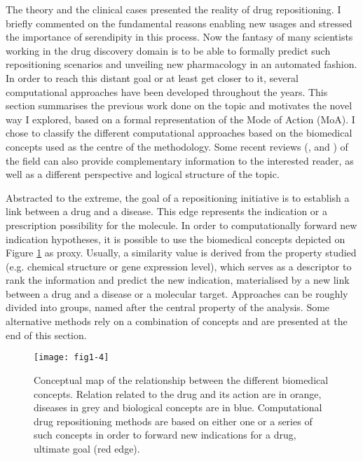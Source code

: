 The theory and the clinical cases presented the reality of drug repositioning. I briefly commented on the fundamental reasons enabling new usages and stressed the importance of serendipity in this process. Now the fantasy of many scientists working in the drug discovery domain is to be able to formally predict such repositioning scenarios and unveiling new pharmacology in an automated fashion. In order to reach this distant goal or at least get closer to it, several computational approaches have been developed throughout the years. This section summarises the previous work done on the topic and motivates the novel way I explored, based on a formal representation of the Mode of Action (MoA). I chose to classify the different computational approaches based on the biomedical concepts used as the centre of the methodology. Some recent reviews (\cite{ashburn2004drug}, \cite{dudley2011exploiting} and \cite{hurle2013computational}) of the field can also provide complementary information to the interested reader, as well as a different perspective and logical structure of the topic.

Abstracted to the extreme, the goal of a repositioning initiative is to establish a link between a drug and a disease. This edge represents the indication or a prescription possibility for the molecule. In order to computationally forward new indication hypotheses, it is possible to use the biomedical concepts depicted on Figure \ref{fig1-4} as proxy. Usually, a similarity value is derived from the property studied (e.g. chemical structure or gene expression level), which serves as a descriptor to rank the information and predict the new indication, materialised by a new link between a drug and a disease or a molecular target. Approaches can be roughly divided into groups, named after the central property of the analysis. Some alternative methods rely on a combination of concepts and are presented at the end of this section.

\begin{figure}[ht]
    \centering
    \texttt{[image: fig1-4]}
    \caption{Conceptual map of the relationship between the different biomedical concepts. Relation related to the drug and its action are in orange, diseases in grey and biological concepts are in blue. Computational drug repositioning methods are based on either one or a series of such concepts in order to forward new indications for a drug, ultimate goal (red edge).}
    \label{fig1-4}
\end{figure}

